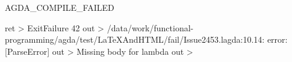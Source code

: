 AGDA_COMPILE_FAILED

ret > ExitFailure 42 out > /data/work/functional-programming/agda/test/LaTeXAndHTML/fail/Issue2453.lagda:10.14: error: [ParseError] out > Missing body for lambda out >